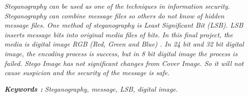 \documentclass{jtetiskripsi}
\begin{document}
\begin{abstracteng}
	\textit{Steganography can be used as one of the techniques in information security. Steganography can combine message files so others do not know of hidden message files. One method of steganography is Least Significant Bit (LSB). LSB inserts message bits into original media files of bits. In this final project, the media is digital image RGB (Red, Green and Blue) . In 24 bit and 32 bit digital image, the encoding process is success, but in 8 bit digital image the process is failed. Stego Image has not significant changes from Cover Image. So it will not cause suspicion and the security of the message is safe.}    
	
	\bigskip
	\noindent
	\textbf{\emph{Keywords :}} \emph{Steganography, message, LSB, digital image}.
\end{abstracteng}
\begin{counterpage}
\end{counterpage}








\end{document}
